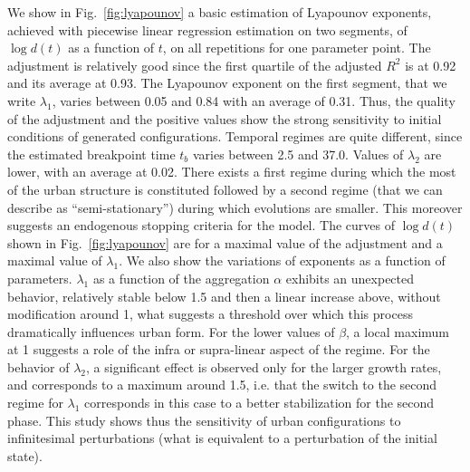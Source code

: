 \documentclass[fleqn,10pt]{wlscirep}
\begin{document}
We show in Fig.~\ref{fig:lyapounov} a basic estimation of Lyapounov exponents, achieved with piecewise linear regression estimation on two segments, of $\log d(t)$ as a function of $t$, on all repetitions for one parameter point. The adjustment is relatively good since the first quartile of the adjusted $R^2$ is at 0.92 and its average at 0.93. The Lyapounov exponent on the first segment, that we write $\lambda_1$, varies between 0.05 and 0.84 with an average of 0.31. Thus, the quality of the adjustment and the positive values show the strong sensitivity to initial conditions of generated configurations. Temporal regimes are quite different, since the estimated breakpoint time $t_b$ varies between 2.5 and 37.0. Values of $\lambda_2$ are lower, with an average at 0.02. There exists a first regime during which the most of the urban structure is constituted followed by a second regime (that we can describe as ``semi-stationary'') during which evolutions are smaller. This moreover suggests an endogenous stopping criteria for the model. The curves of $\log d(t)$ shown in Fig.~\ref{fig:lyapounov} are for a maximal value of the adjustment and a maximal value of $\lambda_1$. We also show the variations of exponents as a function of parameters. $\lambda_1$ as a function of the aggregation $\alpha$ exhibits an unexpected behavior, relatively stable below 1.5 and then a linear increase above, without modification around 1, what suggests a threshold over which this process dramatically influences urban form. For the lower values of $\beta$, a local maximum at 1 suggests a role of the infra or supra-linear aspect of the regime. For the behavior of $\lambda_2$, a significant effect is observed only for the larger growth rates, and corresponds to a maximum around 1.5, i.e. that the switch to the second regime for $\lambda_1$ corresponds in this case to a better stabilization for the second phase. This study shows thus the sensitivity of urban configurations to infinitesimal perturbations (what is equivalent to a perturbation of the initial state).
\end{document}

